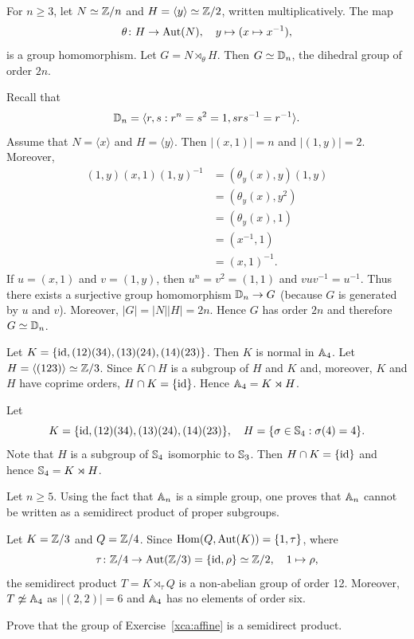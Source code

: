 \begin{example}
    For $n\geq3$, let 
$N\simeq \mathbb{Z}/n$ and $H=\langle y\rangle\simeq\mathbb{Z}/2$, written multiplicatively. The map \[
\theta\colon H\to\operatorname{Aut}(N),\quad  
y\mapsto (x\mapsto x^{-1}),
\]
is a group homomorphism. Let $G=N\rtimes_\theta H$.
Then $G\simeq\mathbb{D}_n$, the dihedral group of order $2n$.

Recall that 
\[
\mathbb{D}_n=\langle r,s:r^n=s^2=1, srs^{-1}=r^{-1}\rangle.
\]
Assume that $N=\langle x\rangle$ and $H=\langle y\rangle$. Then $|(x,1)|=n$ and $|(1,y)|=2$. 
Moreover,
\begin{align*}
(1,y)(x,1)(1,y)^{-1} &= (\theta_y(x),y)(1,y)\\
&=(\theta_y(x),y^2)\\
&=(\theta_y(x),1)\\
&=(x^{-1},1)\\
&=(x,1)^{-1}.
\end{align*}
If $u=(x,1)$ and $v=(1,y)$, then $u^n=v^2=(1,1)$ and $vuv^{-1}=u^{-1}$. Thus there exists 
a surjective group homomorphism 
$\mathbb{D}_n\to G$ (because $G$ is generated by $u$ and $v$). Moreover, $|G|=|N||H|=2n$. Hence 
$G$ has order $2n$ and therefore $G\simeq\mathbb{D}_n$.
\end{example}

\begin{example}
Let $K=\{\operatorname{id},(12)(34),(13)(24),(14)(23)\}$. Then $K$ is normal in $\mathbb{A}_4$. 
Let $H=\langle (123)\rangle\simeq\mathbb{Z}/3$. Since $K\cap H$ is a subgroup of $H$ and $K$ and, moreover, 
$K$ and $H$ have coprime orders, $H\cap K=\{\operatorname{id}\}$. Hence $\mathbb{A}_4=K\rtimes H$.
\end{example}

\begin{example}
\label{exa:T}
Let 
\[
K=\{\operatorname{id},(12)(34),(13)(24),(14)(23)\},\quad  
H=\{\sigma\in\mathbb{S}_4:\sigma(4)=4\}.
\]
Note that $H$ is a subgroup of 
$\mathbb{S}_4$ isomorphic to $\mathbb{S}_3$. Then $H\cap K=\{\operatorname{id}\}$ and hence 
$\mathbb{S}_4=K\rtimes H$.
\end{example}

Let $n\geq5$. 
Using the fact that $\mathbb{A}_n$ is a simple group,  
one proves that $\mathbb{A}_n$ cannot be written as a semidirect product of proper subgroups. 

\begin{example}
Let $K=\mathbb{Z}/3$ and $Q=\mathbb{Z}/4$. Since $\operatorname{Hom}(Q,\operatorname{Aut}(K))=\{1,\tau\}$, where 
\[
\tau\colon\mathbb{Z}/4\to\operatorname{Aut}(\mathbb{Z}/3)=\{\operatorname{id},\rho\}\simeq\mathbb{Z}/2,\quad 1\mapsto\rho,
\]
the semidirect product $T=K\rtimes_\tau Q$ is a non-abelian group of order 12. Moreover,
$T\not\simeq\mathbb{A}
_4$ as $|(2,2)|=6$ and $\mathbb{A}_4$ has no elements of order six.
\end{example}


\begin{exercise}
    \label{xca:affine_semidirect}
    Prove that the group of Exercise~\ref{xca:affine} is a semidirect product. 
\end{exercise}
